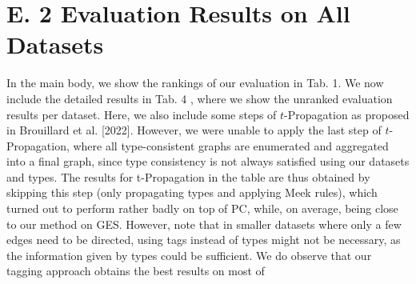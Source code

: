 \documentclass[10pt]{article}
\begin{document}
\section*{E. 2 Evaluation Results on All Datasets}
In the main body, we show the rankings of our evaluation in Tab. 1. We now include the detailed results in Tab. 4 , where we show the unranked evaluation results per dataset. Here, we also include some steps of $t$-Propagation as proposed in Brouillard et al. [2022]. However, we were unable to apply the last step of $t$-Propagation, where all type-consistent graphs are enumerated and aggregated into a final graph, since type consistency is not always satisfied using our datasets and types. The results for t-Propagation in the table are thus obtained by skipping this step (only propagating types and applying Meek rules), which turned out to perform rather badly on top of PC, while, on average, being close to our method on GES. However, note that in smaller datasets where only a few edges need to be directed, using tags instead of types might not be necessary, as the information given by types could be sufficient. We do observe that our tagging approach obtains the best results on most of
\end{document}
